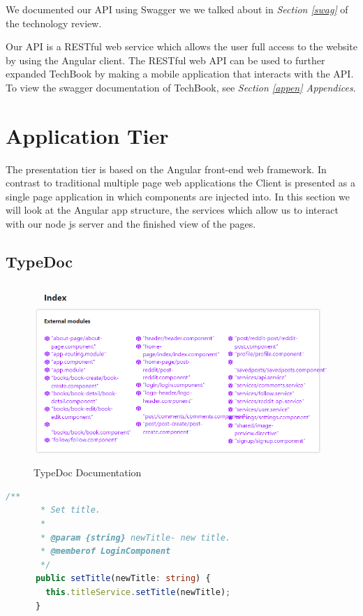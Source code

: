 We documented our API using Swagger we we talked about in \textit{Section \ref{swag} } of the technology review.

Our API is a RESTful web service which allows the user full access to the website by using the Angular client. The RESTful web API can be used to further expanded TechBook by making a mobile application that interacts with the API. To view the swagger documentation of TechBook, see \textit{Section \ref{appen} Appendices}.

\section{Application Tier}
The presentation tier is based on the Angular front-end web framework. In contrast to traditional multiple page web applications the Client is presented as a single page application in which components are injected into. In this section we will look at the Angular app structure, the services which allow us to interact with our node js server and the finished view of the pages.

\subsection{TypeDoc}
\begin{figure}[H]
  \includegraphics[width=\linewidth]{img/typeDoc.png}
  \caption{TypeDoc Documentation}
  \label{fig:typeDoc}
\end{figure}

\begin{lstlisting}[language=TypeScript,caption={TypeDoc Annotation},captionpos=b,label={fig:typeDocExample}]
     /**
       * Set title.
       *
       * @param {string} newTitle- new title.
       * @memberof LoginComponent
       */
      public setTitle(newTitle: string) {
        this.titleService.setTitle(newTitle);
      }
\end{lstlisting}


